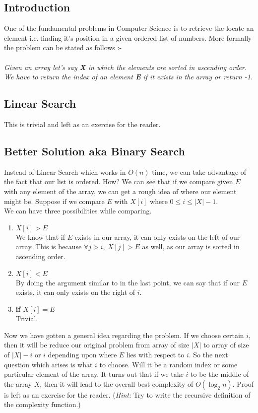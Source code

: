 \documentclass[12pt]{article}
\begin{document}
\begin{large}
\section{Introduction}
One of the fundamental problems in Computer Science is to retrieve the locate an element i.e. finding it's position in a given ordered list of numbers. More formally the problem can be stated as follows :-\\\\
\textit{Given an array let's say \textbf{X} in which the elements are sorted in ascending order.
We have to return the index of an element \textbf{E} if it exists in the array or return -1.}

\subsection{Linear Search}
This is trivial and left as an exercise for the reader. 
\subsection{Better Solution aka Binary Search}
Instead of Linear Search which works in $O(n)$ time, we can take advantage of the fact that our list is ordered. How? We can see that if we compare given $E$ with any element of the array, we can get a rough idea of where our element might be. Suppose if we compare $E$ with $X[i]$ where $0\leq i \leq |X| - 1$.\\
We can have three possibilities while comparing.

\begin{enumerate}
\item \textbf{$X[i] > E$}\\
We know that if $E$ exists in our array, it can only exists on the left of our array. This is because $\forall j > i, \ X[j] > E$ as well, as our array is sorted in ascending order.

\item \textbf{$X[i] < E$}\\
By doing the argument similar to in the last point, we can say that if our $E$ exists, it can only exists on the right of $i$.

\item \textbf{if $X[i] = E$}\\
Trivial.
\end{enumerate}

Now we have gotten a general idea regarding the problem. If we choose certain $i$, then it will be reduce our original problem from array of size $|X|$ to array of size of $|X|-i$ or $i$ depending upon where $E$ lies with respect to $i$. So the next question which arises is what $i$ to choose. Will it be a random index or some particular element of the array. It turns out that if we take $i$ to be the middle of the array $X$, then it will lead to the overall best complexity of $O(\log_2 n)$. Proof is left as an exercise for the reader. (\textit{Hint: }Try to write the recursive definition of the complexity function.)


\end{large}
\end{document}
